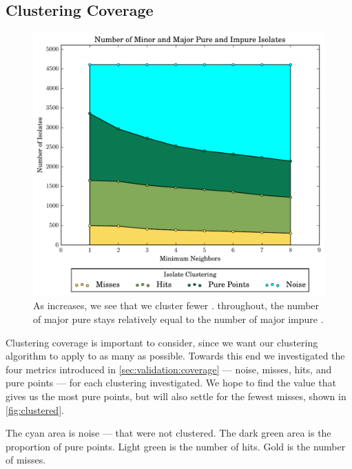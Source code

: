 \subsection{Clustering Coverage}
\begin{figure}[ht!]
    \centering
    \includegraphics[width=\linewidth]{figures/bs/neigh_minor_major_impure_filled_stack}
    \caption{As \minneigh{} increases, we see that we cluster fewer \isols{}. throughout, the number of major pure \isols{} stays relatively equal to the number of major impure \isols{}.}
    \label{fig:clustered}
\end{figure}

Clustering coverage is important to consider, since we want our clustering algorithm to apply to as many \isols{} as possible.
Towards this end we investigated the four metrics introduced in \autoref{sec:validation:coverage} --- noise, misses, hits, and pure points --- for each \minneigh{} clustering investigated.
We hope to find the \minneigh{} value that gives us the most pure points, but will also settle for the fewest misses, shown in \autoref{fig:clustered}.

The cyan area is noise --- \isols{} that were not clustered. 
The dark green area is the proportion of pure points. 
Light green is the number of hits.
Gold is the number of misses.


